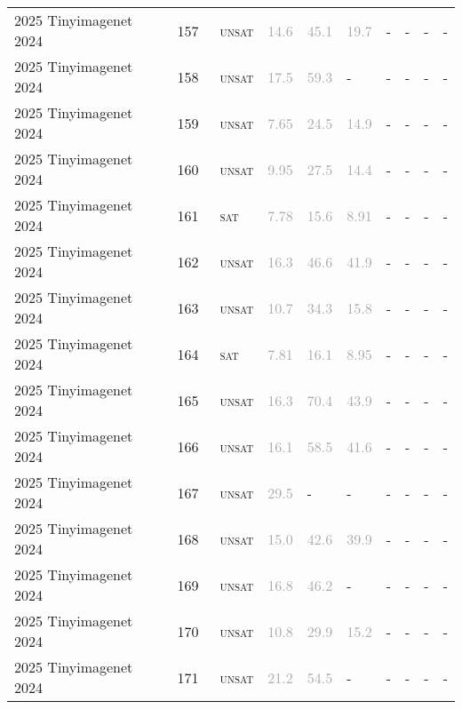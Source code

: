 \begin{center}
{\begin{longtable}{@{}llllllllll@{}}
2025 Tinyimagenet 2024 & 157 & ~\textsc{unsat} & \textcolor{darkgray}{14.6} & \textcolor{darkgray}{45.1} & \textcolor{darkgray}{19.7} & - & - & - & - \\
2025 Tinyimagenet 2024 & 158 & ~\textsc{unsat} & \textcolor{darkgray}{17.5} & \textcolor{darkgray}{59.3} & - & - & - & - & - \\
2025 Tinyimagenet 2024 & 159 & ~\textsc{unsat} & \textcolor{darkgray}{7.65} & \textcolor{darkgray}{24.5} & \textcolor{darkgray}{14.9} & - & - & - & - \\
2025 Tinyimagenet 2024 & 160 & ~\textsc{unsat} & \textcolor{darkgray}{9.95} & \textcolor{darkgray}{27.5} & \textcolor{darkgray}{14.4} & - & - & - & - \\
2025 Tinyimagenet 2024 & 161 & ~\textsc{sat} & \textcolor{darkgray}{7.78} & \textcolor{darkgray}{15.6} & \textcolor{darkgray}{8.91} & - & - & - & - \\
2025 Tinyimagenet 2024 & 162 & ~\textsc{unsat} & \textcolor{darkgray}{16.3} & \textcolor{darkgray}{46.6} & \textcolor{darkgray}{41.9} & - & - & - & - \\
2025 Tinyimagenet 2024 & 163 & ~\textsc{unsat} & \textcolor{darkgray}{10.7} & \textcolor{darkgray}{34.3} & \textcolor{darkgray}{15.8} & - & - & - & - \\
2025 Tinyimagenet 2024 & 164 & ~\textsc{sat} & \textcolor{darkgray}{7.81} & \textcolor{darkgray}{16.1} & \textcolor{darkgray}{8.95} & - & - & - & - \\
2025 Tinyimagenet 2024 & 165 & ~\textsc{unsat} & \textcolor{darkgray}{16.3} & \textcolor{darkgray}{70.4} & \textcolor{darkgray}{43.9} & - & - & - & - \\
2025 Tinyimagenet 2024 & 166 & ~\textsc{unsat} & \textcolor{darkgray}{16.1} & \textcolor{darkgray}{58.5} & \textcolor{darkgray}{41.6} & - & - & - & - \\
2025 Tinyimagenet 2024 & 167 & ~\textsc{unsat} & \textcolor{darkgray}{29.5} & - & - & - & - & - & - \\
2025 Tinyimagenet 2024 & 168 & ~\textsc{unsat} & \textcolor{darkgray}{15.0} & \textcolor{darkgray}{42.6} & \textcolor{darkgray}{39.9} & - & - & - & - \\
2025 Tinyimagenet 2024 & 169 & ~\textsc{unsat} & \textcolor{darkgray}{16.8} & \textcolor{darkgray}{46.2} & - & - & - & - & - \\
2025 Tinyimagenet 2024 & 170 & ~\textsc{unsat} & \textcolor{darkgray}{10.8} & \textcolor{darkgray}{29.9} & \textcolor{darkgray}{15.2} & - & - & - & - \\
2025 Tinyimagenet 2024 & 171 & ~\textsc{unsat} & \textcolor{darkgray}{21.2} & \textcolor{darkgray}{54.5} & - & - & - & - & - \\

\end{longtable}}
\end{center}
